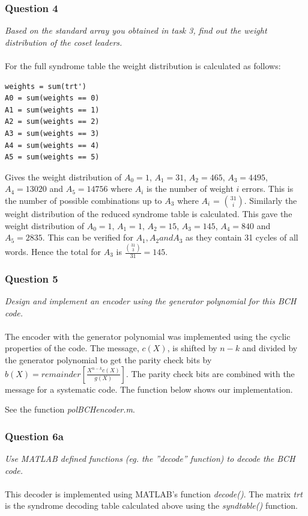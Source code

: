 \documentclass[a4paper]{article}
\begin{document}
\subsubsection{Question 4} \textit{Based on the standard array you obtained in task 3, find out the weight distribution of the coset leaders.}\\
\\
For the full syndrome table the weight distribution is calculated as follows:
\begin{lstlisting}
weights = sum(trt')
A0 = sum(weights == 0)
A1 = sum(weights == 1)
A2 = sum(weights == 2)
A3 = sum(weights == 3)
A4 = sum(weights == 4)
A5 = sum(weights == 5)
\end{lstlisting}
Gives the weight distribution of $A_0 = 1$, $A_1 = 31$, $A_2 = 465$, $A_3 = 4495$, $A_4 = 13020$ and $A_5 = 14756$ where $A_i$ is the number of weight $i$ errors. This is the number of possible combinations up to $A_3$ where $A_i$ = $ 31 \choose i$. Similarly the weight distribution of the reduced syndrome table is calculated. This gave the weight distribution of $A_0 = 1$, $A_1 = 1$, $A_2 = 15$, $A_3 = 145$, $A_4 = 840$ and $A_5 = 2835$. This can be verified for $A_1, A_2 and A_3$ as they contain 31 cycles of all words. Hence the total for $A_3$ is $ \frac{{31 \choose 3}}{31} = 145$.

\subsubsection{Question 5} \textit{Design and implement an encoder using the generator polynomial for this BCH code.} \\
\\
The encoder with the generator polynomial was implemented using the cyclic properties of the code. The message, $c(X)$, is shifted by $n-k$ and divided by the generator polynomial to get the parity check bits by $b(X) = remainder[\frac{X^{n-k}c(X)}{g(X)}]$. The parity check bits are combined with the message for a systematic code. The function below shows our implementation.

See the function \textit{polBCHencoder.m}.

\subsubsection{Question 6a} \textit{Use MATLAB defined functions (eg. the ”decode” function) to decode the BCH code.}\\
\\
This decoder is implemented using MATLAB’s function \textit{decode()}. The matrix \textit{trt} is the syndrome decoding table calculated above using the \textit{syndtable()} function.
\end{document}
